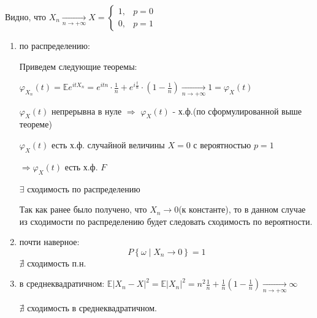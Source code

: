 \documentclass[a4paper,12pt]{article}
\newcommand{\lt}{\left}
\newcommand{\rt}{\right}
\newcommand{\fr}{\frac}
\newcommand{\bb}{\mathbb}
\newcommand{\vp}{\varphi}
\begin{document}
\begin{itemize}
Видно, что $X_n\xrightarrow[n \to +\infty]{} X = \begin{cases}
1,& p = 0\\
0,& p =  1
\end{cases}$
\begin{enumerate}
\item по распределению:

Приведем следующие теоремы:

$\vp_{X_n}(t) = \bb E e^{itX_n} = e^{itn}\cdot\fr{1}{n} + e^{i\fr{t}{n}}\cdot\lt(1 - \fr{1}{n}\rt) \xrightarrow[n \to +\infty]{} 1 = \vp_X(t)$

$\vp_X(t)$ непрерывна в нуле $\Rightarrow$ $\vp_X(t)$ - х.ф.(по сформулированной выше теореме)

$\vp_X(t)$ есть х.ф. случайной величины $X = 0$ с вероятностью $p = 1$

$\Rightarrow$$\vp_X(t)$ есть х.ф. $F$

$\exists $ сходимость по распределению

Так как ранее было получено, что $X_n \rightarrow 0$(к константе), то в данном случае из сходимости по распределению будет следовать сходимость по вероятности.

\item почти наверное:
	$$P\lt\{\omega\mid X_n \rightarrow 0\rt\} = 1$$
$\nexists$ сходимость п.н.

\item в среднеквадратичном:
$\bb E|X_n - X|^2 = \bb E|X_n|^2 = n^2 \fr{1}{n} + \fr{1}{n}\lt(1 - \fr{1}{n}\rt)\xrightarrow[n \to +\infty]{} \infty$

$\nexists$ сходимость в среднеквадратичном.


\end{enumerate}
\end{itemize}
\end{document}
